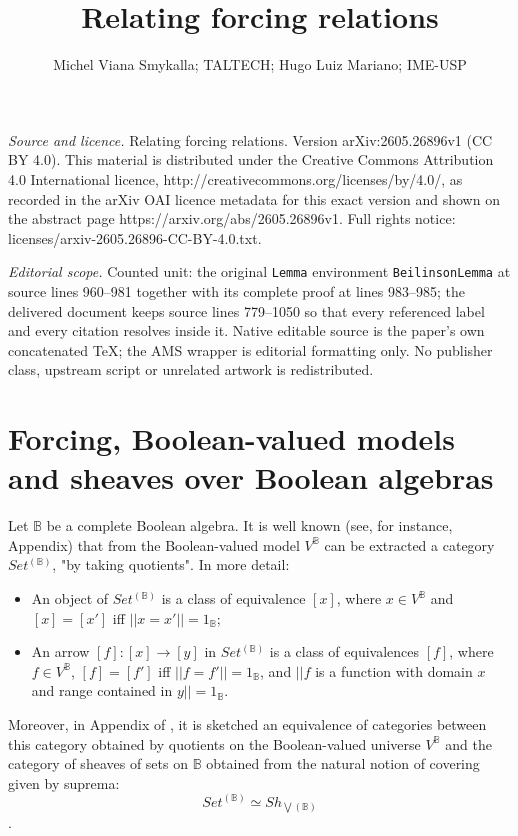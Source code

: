 \documentclass[10pt,a4paper]{amsart}
\newcommand{\B}{\mathbb{B}}
\begin{document}
\title[Relating forcing relations]{Relating forcing relations}
\author{Michel Viana Smykalla; TALTECH; Hugo Luiz Mariano; IME-USP}
\date{}
\maketitle
\noindent\emph{Source and licence.} Relating forcing relations. Version arXiv:2605.26896v1 (CC BY 4.0). This material is distributed under the Creative Commons Attribution 4.0 International licence, http://creativecommons.org/licenses/by/4.0/, as recorded in the arXiv OAI licence metadata for this exact version and shown on the abstract page https://arxiv.org/abs/2605.26896v1. Full rights notice: licenses/arxiv-2605.26896-CC-BY-4.0.txt.\par\smallskip
\noindent\textit{Editorial scope.} Counted unit: the original \texttt{Lemma} environment \texttt{BeilinsonLemma} at source lines 960--981 together with its complete proof at lines 983--985; the delivered document keeps source lines 779--1050 so that every referenced label and every citation resolves inside it. Native editable source is the paper's own concatenated TeX; the AMS wrapper is editorial formatting only. No publisher class, upstream script or unrelated artwork is redistributed.
\section{Forcing, Boolean-valued models and sheaves over Boolean algebras}\label{forcingmodelsandsheaves}



Let $\B$ be a complete Boolean algebra. It is well known (see, for instance, \cite{Bell05} Appendix) that from the Boolean-valued model $V^\B$ can be extracted a category  $Set^{(\B)}$, "by taking quotients". In more detail:
\begin{itemize}
\item An object of  $Set^{(\B)}$ is a class of equivalence $[x]$, where $x \in V^\B$ and $[x] = [x']$ iff $||x = x'|| = 1_{\B}$;
\item An arrow $[f] : [x] \to [y]$ in $Set^{(\B)}$ is a class of equivalences $[f]$, where $f \in V^\B$,  $[f] = [f']$ iff $||f = f'|| = 1_{\B}$, and $|| f$ is a function with domain $x$ and range contained in $y|| = 1_\B$. 
\end{itemize}

Moreover, in Appendix  of \cite{Bell05}, it is sketched an equivalence of categories between this category obtained by quotients on the Boolean-valued universe $V^\B$ and the category of sheaves of sets on $\B$ obtained from the natural notion of covering given by suprema: $$Set^{(\B)} \simeq Sh_{\bigvee(\B)}$$.
\end{document}
